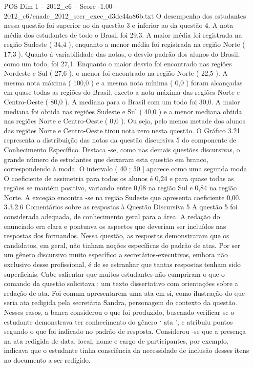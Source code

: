 \begin{textsample}{POS Dim 1 – 2012\_c6 – Score -1.00 – 2012\_c6/enade\_2012\_secr\_exec\_d3dc44a86b.txt}
O desempenho dos estudantes nessa questão foi superior ao da questão 3 e inferior ao da questão 4.
A nota média dos estudantes de todo o Brasil foi 29,3.
A maior média foi registrada na região Sudeste ( 34,4 ), enquanto a menor média foi registrada na região Norte ( 17,3 ).
Quanto à variabilidade das notas, o desvio padrão dos alunos do Brasil, como um todo, foi 27,1.
Enquanto o maior desvio foi encontrado nas regiões Nordeste e Sul ( 27,6 ), o menor foi encontrado na região Norte ( 22,5 ).
A mesma nota máxima ( 100,0 ) e a mesma nota mínima ( 0,0 ) foram alcançadas em quase todas as regiões do Brasil, exceto a nota máxima das regiões Norte e Centro-Oeste ( 80,0 ).
A mediana para o Brasil com um todo foi 30,0.
A maior mediana foi obtida nas regiões Sudeste e Sul ( 40,0 ) e a menor mediana obtida nas regiões Norte e Centro-Oeste ( 0,0 ).
Ou seja, pelo menos metade dos alunos das regiões Norte e Centro-Oeste tirou nota zero nesta questão.
O Gráfico 3.21 representa a distribuição das notas da questão discursiva 5 do componente de Conhecimento Específico.
Destaca -se, como nas demais questões discursivas, o grande número de estudantes que deixaram esta questão em branco, correspondendo à moda.
O intervalo ( 40 ; 50 ] aparece como uma segunda moda.
O coeficiente de assimetria para todos os alunos é 0,24 e para quase todas as regiões se mantém positivo, variando entre 0,08 na região Sul e 0,84 na região Norte.
A exceção encontra -se na região Sudeste que apresenta coeficiente 0,00. 3.3.2.6 Comentários sobre as respostas à Questão Discursiva 5 A questão 5 foi considerada adequada, de conhecimento geral para a área.
A redação do enunciado era clara e pontuava os aspectos que deveriam ser incluídos nas respostas dos formandos.
Nessa questão, as respostas demonstraram que os candidatos, em geral, não tinham noções específicas do padrão de atas.
Por ser um gênero discursivo muito específico a secretários-executivos, embora não exclusivo desse profissional, é de se estranhar que tantas respostas tenham sido superficiais.
Cabe salientar que muitos estudantes não cumpriram o que o comando da questão solicitava : um texto dissertativo com orientações sobre a redação de ata.
Foi comum apresentarem uma ata em si, como ilustração do que seria ata redigida pela secretária Sandra, personagem do contexto da questão.
Nesses casos, a banca considerou o que foi produzido, buscando verificar se o estudante demonstrava ter conhecimento do gênero ‘ ata ’, e atribuiu pontos segundo o que foi indicado no padrão de resposta.
Considerou -se que a presença na ata redigida de data, local, nome e cargo de participantes, por exemplo, indicava que o estudante tinha consciência da necessidade de inclusão desses itens no documento a ser redigido.

\end{textsample}
